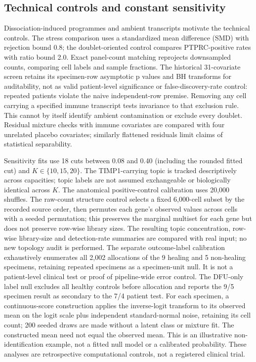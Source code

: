 \subsection{Technical controls and constant sensitivity}
Dissociation-induced programmes and ambient transcripts motivate the technical controls. The stress comparison uses a standardized mean difference (SMD) with rejection bound 0.8; the doublet-oriented control compares PTPRC-positive rates with ratio bound 2.0. Exact panel-count matching reprojects downsampled counts, comparing cell labels and sample fractions. The historical 31-covariate screen retains its specimen-row asymptotic p values and BH transforms for auditability, not as valid patient-level significance or false-discovery-rate control: repeated patients violate the naive independent-row premise. Removing any cell carrying a specified immune transcript tests invariance to that exclusion rule. This cannot by itself identify ambient contamination or exclude every doublet. Residual mixture checks with immune covariates are compared with four unrelated placebo covariates; similarly flattened residuals limit claims of statistical separability.

Sensitivity fits use 18 cuts between 0.08 and 0.40 (including the rounded fitted cut) and $K\in\{10,15,20\}$. The TIMP1-carrying topic is tracked descriptively across capacities; topic labels are not assumed exchangeable or biologically identical across $K$. The anatomical positive-control calibration uses 20,000 shuffles. The raw-count structure control selects a fixed 6,000-cell subset by the recorded source order, then permutes each gene's observed values across cells with a seeded permutation; this preserves the marginal multiset for each gene but does not preserve row-wise library sizes. The resulting topic concentration, row-wise library-size and detection-rate summaries are compared with real input; no new topology audit is performed. The separate outcome-label calibration exhaustively enumerates all 2,002 allocations of the 9 healing and 5 non-healing specimens, retaining repeated specimens as a specimen-unit null. It is not a patient-level clinical test or proof of pipeline-wide error control. The DFU-only label null excludes all healthy controls before allocation and reports the 9/5 specimen result as secondary to the 7/4 patient test. For each specimen, a continuous-score construction applies the inverse-logit transform to its observed mean on the logit scale plus independent standard-normal noise, retaining its cell count; 200 seeded draws are made without a latent class or mixture fit. The constructed mean need not equal the observed mean. This is an illustrative non-identification example, not a fitted null model or a calibrated probability. These analyses are retrospective computational controls, not a registered clinical trial.

